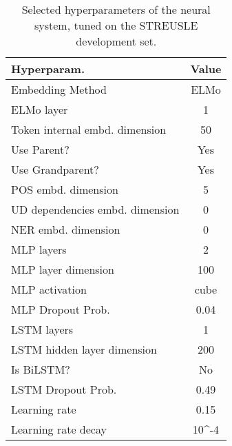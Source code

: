 \begin{table}[]
  \small
	\centering
	\begin{tabular}{@{}l|c@{}}
		\toprule
		Hyperparam. & Value \\
		\midrule
        Embedding Method & ELMo \\
        ELMo layer & 1 \\
        Token internal embd. dimension & 50 \\
        Use Parent? & Yes \\
        Use Grandparent? & Yes \\
        POS embd. dimension  & 5 \\
        UD dependencies embd. dimension  & 0 \\
        NER  embd. dimension  & 0 \\
        MLP layers  & 2 \\
        MLP layer dimension  & 100 \\
        MLP activation  & cube \\
        MLP Dropout Prob.  & 0.04 \\
        LSTM layers  & 1 \\
        LSTM hidden layer dimension  & 200 \\
        Is BiLSTM? & No \\
        LSTM Dropout Prob.  & 0.49 \\
        Learning rate  & 0.15 \\
        Learning rate decay  & 10^{-4} \\
		\bottomrule
	\end{tabular}
	\caption{\label{tab:hyperparams}
        Selected hyperparameters of the neural system, tuned on the STREUSLE development set.
	}

\end{table}
